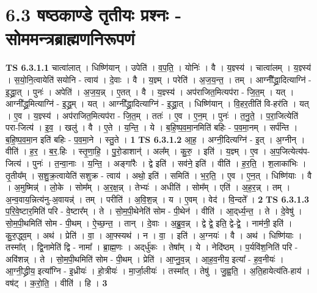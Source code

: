 \documentclass[17pt]{extarticle}
\begin{document}
\section*{ 6.3      षष्ठकाण्डे तृतीयः प्रश्नः - सोममन्त्रब्राह्मणनिरूपणं }
                                \textbf{ TS 6.3.1.1} \newline
                  चात्वा॑लात् । धिष्णि॑यान् । उपेति॑ । व॒प॒ति॒ । योनिः॑ । वै । य॒ज्ञ्स्य॑ । चात्वा॑लम् । य॒ज्ञ्स्य॑ । स॒यो॒नि॒त्वायेति॑ सयोनि - त्वाय॑ । दे॒वाः । वै । य॒ज्ञ्म् । परेति॑ । अ॒ज॒य॒न्त॒ । तम् । आग्नी᳚᳚द्ध्रा॒दित्याग्नि॑ - इ॒द्ध्रा॒त् । पुनः॑ । अपेति॑ । अ॒ज॒य॒न्न् । ए॒तत् । वै । य॒ज्ञ्स्य॑ । अप॑राजित॒मित्यप॑रा - जि॒त॒म् । यत् । आग्नी᳚द्ध्र॒मित्याग्नि॑ - इ॒द्ध्र॒म् । यत् । आग्नी᳚द्ध्रा॒दित्याग्नि॑ - इ॒द्ध्रा॒त् । धिष्णि॑यान् । वि॒हर॒तीति॑ वि-हर॑ति । यत् । ए॒व । य॒ज्ञ्स्य॑ । अप॑राजित॒मित्यप॑रा - जि॒त॒म् । ततः॑ । ए॒व । ए॒न॒म् । पुनः॑ । त॒नु॒ते॒ । प॒रा॒जित्येति॑ परा-जित्य॑ । इ॒व॒ । खलु॑ । वै । ए॒ते । य॒न्ति॒ । ये । ब॒हि॒ष्प॒व॒मा॒नमिति॑ बहिः - प॒व॒मा॒नम् । सर्प॑न्ति । ब॒हि॒ष्प॒व॒मा॒न इति॑ बहिः - प॒व॒मा॒ने । स्तु॒ते । \textbf{  1} \newline
                  \newline
                                \textbf{ TS 6.3.1.2} \newline
                  आ॒ह॒ । अग्नी॒दित्यग्नि॑ - इ॒त् । अ॒ग्नीन् । वीति॑ । ह॒र॒ । ब॒र॒.हिः । स्तृ॒णा॒हि॒ । पु॒रो॒डाशान्॑ । अल᳚म् । कु॒रु॒ । इति॑ । य॒ज्ञ्म् । ए॒व । अ॒प॒जित्येत्य॑प-जित्य॑ । पुनः॑ । त॒न्वा॒नाः । य॒न्ति॒ । अङ्गा॑रैः । द्वे इति॑ । सव॑ने॒ इति॑ । वीति॑ । ह॒र॒ति॒ । श॒लाका॑भिः । तृ॒तीय᳚म् । स॒शु॒क्र॒त्वायेति॑ सशुक्र - त्वाय॑ । अथो॒ इति॑ । समिति॑ । भ॒र॒ति॒ । ए॒व । ए॒न॒त् । धिष्णि॑याः । वै । अ॒मुष्मिन्न्॑ । लो॒के । सोम᳚म् । अ॒र॒क्ष॒न्न् । तेभ्यः॑ । अधीति॑ । सोम᳚म् । एति॑ । अ॒ह॒र॒न्न् । तम् । अ॒न्व॒वाय॒न्नित्य॑नु-अ॒वायन्न्॑ । तम् । परीति॑ । अ॒वि॒श॒न्न् । य । ए॒वम् । वेद॑ । वि॒न्दते᳚ । \textbf{  2} \newline
                  \newline
                                \textbf{ TS 6.3.1.3} \newline
                  प॒रि॒वे॒ष्टार॒मिति॑ परि - वे॒ष्टार᳚म् । ते । सो॒म॒पी॒थेनेति॑ सोम - पी॒थेन॑ । वीति॑ । आ॒द्‌र्ध्य॒न्त॒ । ते । दे॒वेषु॑ । सो॒म॒पी॒थमिति॑ सोम - पी॒थम् । ऐ॒च्छ॒न्त॒ । तान् । दे॒वाः । अ॒ब्रु॒व॒न्न् । द्वे द्वे॒ इति॒ द्वे-द्वे॒ । नाम॑नी॒ इति॑ । कु॒रु॒द्ध्व॒म् । अथ॑ । प्रेति॑ । वा॒ । आ॒फ्स्यथ॑ । न । वा॒ । इति॑ । अ॒ग्नयः॑ । वै । अथ॑ । धिष्णि॑याः । तस्मा᳚त् । द्वि॒नामेति॑ द्वि - नामा᳚ । ब्रा॒ह्म॒णः । अद्‌र्धु॑कः । तेषा᳚म् । ये । नेदि॑ष्ठम् । प॒र्यवि॑श॒निति॑ परि - अवि॑शन्न् । ते । सो॒म॒पी॒थमिति॑ सोम - पी॒थम् । प्रेति॑ । आ॒प्नु॒व॒न्न् । आ॒ह॒व॒नीय॒ इत्या᳚ - ह॒व॒नीयः॑ । आ॒ग्नी॒द्ध्रीय॒ इत्या᳚ग्नि - इ॒ध्रीयः॑ । हो॒त्रीयः॑ । मा॒र्जा॒लीयः॑ । तस्मा᳚त् । तेषु॑ । जु॒ह्व॒ति॒ । अ॒ति॒हायेत्य॑ति-हाय॑ । वष॑ट् । क॒रो॒ति॒ । वीति॑ । हि । \textbf{  3} \newline
\end{document}
